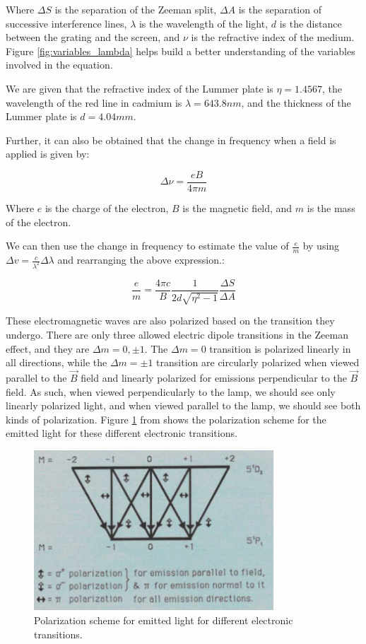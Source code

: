 Where $\Delta S$ is the separation of the Zeeman split, $\Delta A$ is the separation of successive interference lines, $\lambda$ is the wavelength of the light, $d$ is the distance between the grating and the screen, and $\nu$ is the refractive index of the medium.
Figure \ref{fig:variables_lambda} helps build a better understanding of the variables involved in the equation.

We are given that the refractive index of the Lummer plate is $\eta = 1.4567$, the wavelength of the red line in cadmium is $\lambda = 643.8 nm$, and the thickness of the Lummer plate is $d = 4.04 mm$.

Further, it can also be obtained that the change in frequency when a field is applied is given by:

\begin{equation}
    \Delta \nu = \frac{e B}{4\pi m}
\end{equation}

Where $e$ is the charge of the electron, $B$ is the magnetic field, and $m$ is the mass of the electron.

We can then use the change in frequency to estimate the value of $\frac{e}{m}$ by using $\Delta v = \frac{c}{\lambda^2} \Delta \lambda$ and rearranging the above expression.:

\begin{equation} \label{eq:em_relationship}
    \frac{e}{m} =
    \frac{4 \pi c}{B} \frac{1}{2d\sqrt{\eta^2 - 1}} \frac{\Delta S}{\Delta A}
\end{equation}

These electromagnetic waves are also polarized based on the transition they undergo. There are only three allowed electric dipole transitions in the Zeeman effect, and they are $\Delta m = 0, \pm1$. The $\Delta m = 0$ transition is polarized linearly in all directions, while the $\Delta m = \pm1$ transition are circularly polarized when viewed parallel to the $\vec{B}$ field and linearly polarized for emissions perpendicular to the $\vec{B}$ field. As such, when viewed perpendicularly to the lamp, we should see only linearly polarized light, and when viewed parallel to the lamp, we should see both kinds of polarization. Figure \ref{fig:polarization_scheme} from \cite{ZeemanEffectLab} shows the polarization scheme for the emitted light for these different electronic transitions.

\begin{figure}
    \centering
    \includegraphics[width=0.8\textwidth]{intro/polarization_scheme.png}
    \caption{Polarization scheme for emitted light for different electronic transitions.}
    \label{fig:polarization_scheme}
\end{figure}